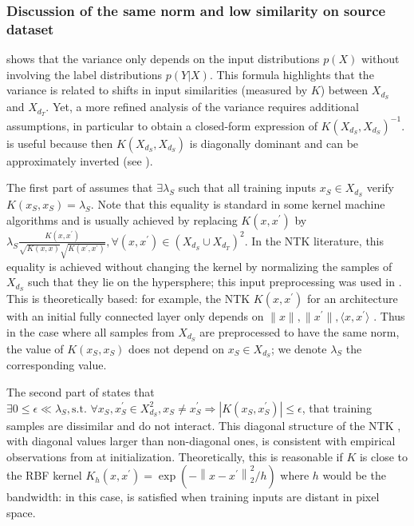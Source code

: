\subsubsection{Discussion of the same norm and low similarity  on source dataset}
\label{app:discussion_inter_sample}
 shows that the variance only depends on the input distributions $p(X)$ without involving the label distributions $p(Y|X)$.
This formula highlights that the variance is related to shifts in input similarities (measured by $K$) between $X_{d_S}$ and $X_{d_T}$.
Yet, a more refined analysis of the variance requires additional assumptions, in particular to obtain a closed-form expression of $K(X_{d_S}, X_{d_S})^{-1}$.
 is useful because then $K(X_{d_S}, X_{d_S})$ is diagonally dominant and can be approximately inverted (see ).

The first part of  assumes that $\exists \lambda_S$ such that all training inputs $x_S\in X_{d_S}$ verify $K(x_S, x_S)= \lambda_S$.
Note that this equality is standard in some kernel machine algorithms \cite{ah2010normalized,ghojogh2021reproducing,rennie2005} and is usually achieved by replacing $K(x,x^\prime)$ by $\lambda_S \frac{K(x,x^\prime)}{\sqrt{K(x,x)}\sqrt{K(x^\prime,x^\prime)}}, \forall(x,x^\prime)\in {(X_{d_S}\cup X_{d_T})}^2$. 
In the NTK literature, this equality is achieved without changing the kernel by normalizing the samples of $X_{d_S}$ such that they lie on the hypersphere; this input preprocessing was used in \cite{Lee2018DeepNN}.
This is theoretically based: for example, the NTK $K(x, x^\prime)$ for an architecture with an initial fully connected layer only depends on $\|x\|,\|x^\prime\|,\langle x, x^\prime\rangle$ \cite{yang2019}. Thus in the case where all samples from $X_{d_S}$ are preprocessed to have the same norm, the value of $K(x_S,x_S)$ does not depend on $x_S\in X_{d_S}$; we denote $\lambda_S$ the corresponding value.

The second part of  states that $\exists 0 \leq \epsilon \ll \lambda_S, \text{s.t.~} \forall x_S, x_S^\prime \in X_{d_S}^2, x_S\neq x_S^\prime \Rightarrow |K(x_S,x_S^\prime)|\leq\epsilon$, \ie that training samples are dissimilar and do not interact.
This diagonal structure of the NTK \cite{Jacot2018}, with diagonal values larger than non-diagonal ones, is consistent with empirical observations from \cite{seleznova2022neural} at initialization.
Theoretically, this is reasonable if $K$ is close to the RBF kernel $K_{h}\left(x, x^{\prime}\right)=\exp (-\left\|x-x^{\prime}\right\|_{2}^{2}/h)$ where $h$ would be the bandwidth: in this case,  is satisfied when training inputs are distant in pixel space.


